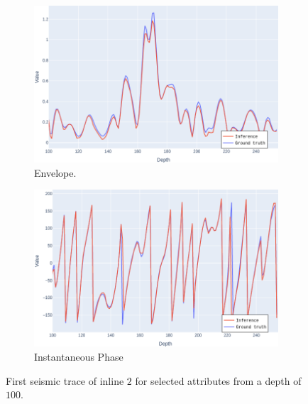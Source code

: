 \documentclass[conference]{IEEEtran}
\begin{document}
\begin{figure}[!t]
     \begin{subfigure}[b]{0.49\textwidth}%
        \includegraphics[width=1.0\columnwidth]{Fig/envelopeLine.png}
        \caption{
        Envelope.}
        \label{fig:eline}
     \end{subfigure}
     \begin{subfigure}[b]{0.49\textwidth}%
        \includegraphics[width=1.0\columnwidth]{Fig/instantaneousPhaseLine.png}
        \caption{
        Instantaneous Phase}
        \label{fig:iline}
     \end{subfigure}
       \caption{First seismic trace of inline $2$ for selected attributes from a depth of $100$.}
        \label{fig:examples}
\end{figure}
\end{document}
